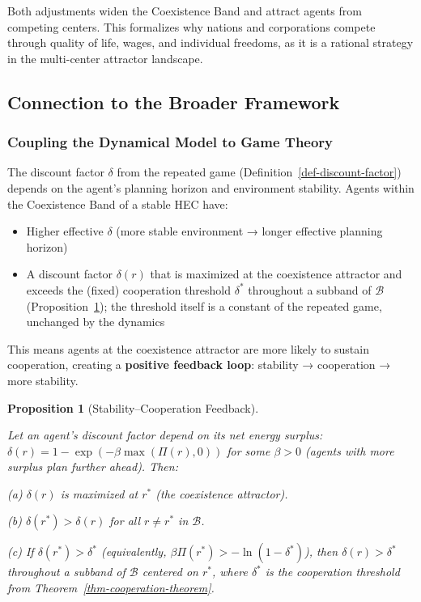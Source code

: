 \documentclass[11pt]{article}
\theoremstyle{plain}
\newtheorem{proposition}[theorem]{Proposition}
\theoremstyle{definition}
\theoremstyle{remark}
\let\origsubsection\subsection
\renewcommand{\subsection}{\needspace{7\baselineskip}\origsubsection}
\let\origsubsubsection\subsubsection
\renewcommand{\subsubsection}{\needspace{4\baselineskip}\origsubsubsection}
\providecommand{\tightlist}{%
  \setlength{\itemsep}{0pt}\setlength{\parskip}{0pt}}
\begin{document}
Both adjustments widen the Coexistence Band and attract agents from
competing centers. This formalizes why nations and corporations compete
through quality of life, wages, and individual freedoms, as it is a
rational strategy in the multi-center attractor landscape.

\subsection{Connection to the Broader
Framework}\label{connection-to-the-broader-framework}

\subsubsection{Coupling the Dynamical Model to Game
Theory}\label{coupling-the-dynamical-model-to-game-theory}

The discount factor \(\delta\) from the repeated game
(Definition~\ref{def-discount-factor}) depends on the agent's planning
horizon and environment stability. Agents within the Coexistence Band of
a stable HEC have:

\begin{itemize}
\tightlist
\item
  Higher effective \(\delta\) (more stable environment → longer
  effective planning horizon)
\item
  A discount factor \(\delta(r)\) that is maximized at the coexistence
  attractor and exceeds the (fixed) cooperation threshold \(\delta^*\)
  throughout a subband of \(\mathcal{B}\)
  (Proposition~\ref{prop-stability-cooperation-feedback}); the threshold
  itself is a constant of the repeated game, unchanged by the dynamics
\end{itemize}

This means agents at the coexistence attractor are more likely to
sustain cooperation, creating a \textbf{positive feedback loop}:
stability → cooperation → more stability.

\begin{proposition}[Stability–Cooperation Feedback]
\label{prop-stability-cooperation-feedback}

Let an agent's discount factor depend on its net energy surplus: $\delta(r) = 1 - \exp(-\beta \max(\Pi(r), 0))$ for some $\beta > 0$ (agents with more surplus plan further ahead). Then:

(a) $\delta(r)$ is maximized at $r^*$ (the coexistence attractor).

(b) $\delta(r^*)> \delta(r)$ for all $r \neq r^*$ in $\mathcal{B}$.

(c) If $\delta(r^*) > \delta^*$ (equivalently, $\beta \Pi(r^*) > -\ln(1-\delta^*)$), then $\delta(r) > \delta^*$ throughout a subband of $\mathcal{B}$ centered on $r^*$, where $\delta^*$ is the cooperation threshold from Theorem~\ref{thm-cooperation-theorem}.
\end{proposition}
\end{document}
